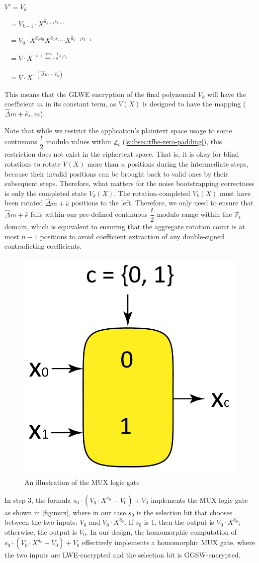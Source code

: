\begin{enumerate}
$V' = V_k$

$\text{ } = V_{k-1} \cdot X^{\hat{a}_{k-1}s_{k-1}}$

$\text{ } = V_0 \cdot X^{\hat{a}_0s_0}X^{\hat{a}_1s_1}\cdots X^{\hat{a}_{k-1}s_{k-1}}$

$\text{ } = V \cdot X^{- \hat{b} + \sum_{i=0}^{k-1}{\hat{a}_is_i}} $

$\text{ } = V \cdot X^{-(\hat{\Delta} m + \hat{e}_b)}$

\end{enumerate}

This means that the GLWE encryption of the final polynomial $V_k$ will have the coefficient $m$ in its constant term, as $V(X)$ is designed to have the mapping ($\hat\Delta m + \hat e_{*}, m$).

Note that while we restrict the application's plaintext space usage to some continuous $\dfrac{t}{2}$ modulo values within $\mathbb{Z}_t$ (\autoref{subsec:tfhe-zero-padding}), this restriction does not exist in the ciphertext space. That is, it is okay for blind rotations to rotate $V(X)$ more than $n$ positions during the intermediate steps, because their invalid positions can be brought back to valid ones by their subsequent steps. Therefore, what matters for the noise bootstrapping correctness is only the completed state $V_k(X)$. The rotation-completed $V_k(X)$ must have been rotated $\hat\Delta m + \hat e$ positions to the left. Therefore, we only need to ensure that  $\hat\Delta m + \hat e$ falls within our pre-defined continuous $\dfrac{t}{2}$ modulo range within the $\mathbb{Z}_t$ domain, which is equivalent to ensuring that the aggregate rotation count is at most $n-1$ positions to avoid coefficient extraction of any double-signed contradicting coefficients. 

\begin{figure}[h!]
    \centering
  \includegraphics[width=0.2\linewidth]{figures/mux.pdf}
  \caption{An illustration of the MUX logic gate }
  \label{fig:mux}
\end{figure}

 In step 3, the formula $s_0 \cdot (V_0 \cdot X^{\hat{a}_0} - V_0) + V_0$ implements the MUX logic gate as shown in \autoref{fig:mux}, where in our case $s_0$ is the selection bit that chooses between the two inputs: $V_0$ and $V_0 \cdot X^{\hat{a}_0}$. If $s_0$ is 1, then the output is $V_0 \cdot X^{\hat{a}_0}$; otherwise, the output is $V_0$. In our design, the homomorphic computation of $s_0 \cdot (V_0 \cdot X^{\hat{a}_0} - V_0) + V_0$ effectively implements a homomorphic MUX gate, where the two inputs are LWE-encrypted and the selection bit is GGSW-encrypted.


